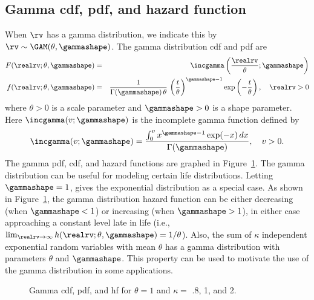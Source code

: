 \subsection{Gamma cdf, pdf, and hazard function}
When $\rv$ has a gamma distribution, 
we indicate this by $\rv \sim \GAM(\theta, \gammashape)$.
The gamma distribution
cdf and pdf are
\begin{eqnarray}  
\label{equation:gamma.cdf} 
 F(\realrv;\theta, \gammashape)&=&\incgamma
 \left (
 \frac{
 \realrv
      }
      {
      \theta
      };  \gammashape
 \right ) \\ 
\label{equation:gamma.pdf}
 f(\realrv;\theta, \gammashape)&=&
\frac{1}{ \Gamma(\gammashape)\,\theta} \,
          \left (
          \frac{t}{\theta}
          \right )^{\gammashape-1}
          \exp \left ( -
          \frac{t}{\theta}
               \right ), \quad \realrv > 0
\end{eqnarray}
where $\theta > 0$ is a scale
parameter and $\gammashape > 0$ is a shape parameter. Here
$\incgamma(v;\gammashape)$ is the incomplete gamma function defined by
\begin{equation}
\label{equation:incomplete.gamma.def}
\incgamma(v;\gammashape)=\frac{\int^{v}_{0} x^{\gammashape-1} \exp(-x)\,dx}
                                   {\Gamma(\gammashape)},
\quad v > 0. 
\end{equation}
The gamma pdf, cdf, and hazard functions
are graphed in Figure~\ref{figure:distplot.gamma.ps}.
The gamma distribution can be useful for modeling certain life
distributions.  Letting $\gammashape=1$, gives the
exponential distribution as a special case.
As shown in Figure~\ref{figure:distplot.gamma.ps}, the
gamma distribution hazard function can be either decreasing (when
$\gammashape<1$) or
increasing (when $\gammashape>1$), in either case
approaching a constant level late in life (i.e.,
$\lim_{\realrv \to \infty} h(\realrv;\theta,
\gammashape)=1/\theta$). Also, the sum of
$\kappa$ independent exponential random variables with mean $\theta$
has a gamma distribution with parameters $\theta$ and
$\gammashape$. This property can be used to motivate the use of the
gamma distribution in some applications.
\begin{figure}
\caption{Gamma
cdf, pdf, and hf for $\theta=1$ and $\kappa=$ .8, 1, and 2.}
\label{figure:distplot.gamma.ps}
\end{figure}


